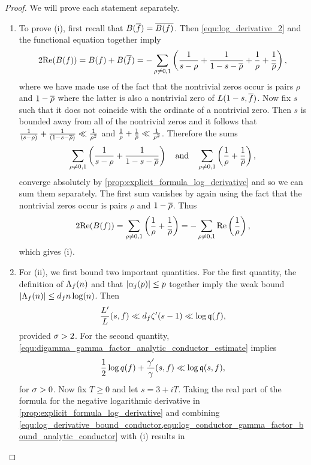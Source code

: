     \begin{proof}
      We will prove each statement separately.
      \begin{enumerate}[label*=(\roman*)]
        \item To prove (i), first recall that  $B(\overline{f}) = \overline{B(f)}$. Then \cref{equ:log_derivative_2} and the functional equation together imply
        \[
          2\mathrm{Re}(B(f)) = B(f)+B(\overline{f}) = -\sum_{\rho \neq 0,1}\left(\frac{1}{s-\rho}+\frac{1}{1-s-\overline{\rho}}+\frac{1}{\rho}+\frac{1}{\overline{\rho}}\right),
        \]
        where we have made use of the fact that the nontrivial zeros occur is pairs $\rho$ and $1-\overline{\rho}$ where the latter is also a nontrivial zero of $L(1-s,\overline{f})$. Now fix $s$ such that it does not coincide with the ordinate of a nontrivial zero. Then $s$ is bounded away from all of the nontrivial zeros and it follows that $\frac{1}{(s-\rho)}+\frac{1}{(1-s-\overline{\rho})} \ll \frac{1}{\rho^{2}}$ and $\frac{1}{\rho}+\frac{1}{\overline{\rho}} \ll \frac{1}{\rho^{2}}$. Therefore the sums
        \[
          \sum_{\rho \neq 0,1}\left(\frac{1}{s-\rho}+\frac{1}{1-s-\overline{\rho}}\right) \quad \text{and} \quad \sum_{\rho \neq 0,1}\left(\frac{1}{\rho}+\frac{1}{\overline{\rho}}\right),
        \]
        converge absolutely by \cref{prop:explicit_formula_log_derivative} and so we can sum them separately. The first sum vanishes by again using the fact that the nontrivial zeros occur is pairs $\rho$ and $1-\overline{\rho}$. Thus
        \[
          2\mathrm{Re}(B(f)) = \sum_{\rho \neq 0,1}\left(\frac{1}{\rho}+\frac{1}{\overline{\rho}}\right) = -\sum_{\rho \neq 0,1}\mathrm{Re}\left(\frac{1}{\rho}\right),
        \]
        which gives (i).
        \item For (ii), we first bound two important quantities. For the first quantity, the definition of $\Lambda_{f}(n)$ and that $|\alpha_{j}(p)| \le p$ together imply the weak bound $|\Lambda_{f}(n)| \le d_{f}n\log(n)$. Then
        \begin{equation}\label{equ:log_derivative_bound_conductor}
          \frac{L'}{L}(s,f) \ll d_{f}\zeta'(s-1) \ll \log{\mathfrak{q}(f)},
        \end{equation}
        provided $\sigma > 2$. For the second quantity, \cref{equ:digamma_gamma_factor_analytic_conductor_estimate} implies
        \begin{equation}\label{equ:log_conductor_gamma_factor_bound_analytic_conductor}
          \frac{1}{2}\log{q(f)}+\frac{\gamma'}{\gamma}(s,f) \ll \log{\mathfrak{q}(s,f)},
        \end{equation}
        for $\sigma > 0$. Now fix $T \ge 0$ and let $s = 3+iT$. Taking the real part of the formula for the negative logarithmic derivative in \cref{prop:explicit_formula_log_derivative} and combining \cref{equ:log_derivative_bound_conductor,equ:log_conductor_gamma_factor_bound_analytic_conductor} with (i) results in

\end{enumerate}
\end{proof}
